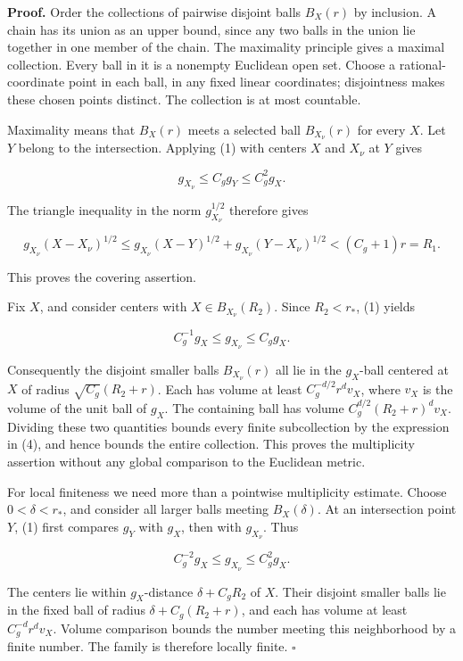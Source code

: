 \documentclass[
  11pt,
]{article}
\begin{document}
\textbf{Proof.} Order the collections of pairwise disjoint balls
\(B_X(r)\) by inclusion. A chain has its union as an upper bound, since
any two balls in the union lie together in one member of the chain. The
maximality principle gives a maximal collection. Every ball in it is a
nonempty Euclidean open set. Choose a rational-coordinate point in each
ball, in any fixed linear coordinates; disjointness makes these chosen
points distinct. The collection is at most countable.

Maximality means that \(B_X(r)\) meets a selected ball \(B_{X_\nu}(r)\)
for every \(X\). Let \(Y\) belong to the intersection. Applying (1) with
centers \(X\) and \(X_\nu\) at \(Y\) gives

\[
g_{X_\nu}\leq C_g g_Y\leq C_g^2g_X.
\]

The triangle inequality in the norm \(g_{X_\nu}^{1/2}\) therefore gives

\[
g_{X_\nu}(X-X_\nu)^{1/2}
\leq g_{X_\nu}(X-Y)^{1/2}+g_{X_\nu}(Y-X_\nu)^{1/2}
<(C_g+1)r=R_1.
\]

This proves the covering assertion.

Fix \(X\), and consider centers with \(X\in B_{X_\nu}(R_2)\). Since
\(R_2<r_*\), (1) yields

\[
C_g^{-1}g_X\leq g_{X_\nu}\leq C_g g_X.
\]

Consequently the disjoint smaller balls \(B_{X_\nu}(r)\) all lie in the
\(g_X\)-ball centered at \(X\) of radius \(\sqrt{C_g}(R_2+r)\). Each has
volume at least \(C_g^{-d/2}r^d v_X\), where \(v_X\) is the volume of
the unit ball of \(g_X\). The containing ball has volume
\(C_g^{d/2}(R_2+r)^d v_X\). Dividing these two quantities bounds every
finite subcollection by the expression in (4), and hence bounds the
entire collection. This proves the multiplicity assertion without any
global comparison to the Euclidean metric.

For local finiteness we need more than a pointwise multiplicity
estimate. Choose \(0<\delta<r_*\), and consider all larger balls meeting
\(B_X(\delta)\). At an intersection point \(Y\), (1) first compares
\(g_Y\) with \(g_X\), then with \(g_{X_\nu}\). Thus

\[
C_g^{-2}g_X\leq g_{X_\nu}\leq C_g^2g_X.
\]

The centers lie within \(g_X\)-distance \(\delta+C_gR_2\) of \(X\).
Their disjoint smaller balls lie in the fixed ball of radius
\(\delta+C_g(R_2+r)\), and each has volume at least \(C_g^{-d}r^dv_X\).
Volume comparison bounds the number meeting this neighborhood by a
finite number. The family is therefore locally finite. \(\square\)
\end{document}
